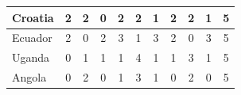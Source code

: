 \documentclass[12pt]{article}  %
\begin{document}
\begin{subappendices}
\begin{longtable}{|l|c|c|c|c|c|c|c|c|c|c|}
	\hline
	Croatia                                                        & 2                                                                      & 2                                                                      & 0                                                                      & 2                                                                      & 2                                                                      & 1                                                                      & 2                         & 2                           & 1                           & 5                           \\ 
	\hline
	Ecuador                                                        & 2                                                                      & 0                                                                      & 2                                                                      & 3                                                                      & 1                                                                      & 3                                                                      & 2                         & 0                           & 3                           & 5                           \\ 
	\hline
	Uganda                                                         & 0                                                                      & 1                                                                      & 1                                                                      & 1                                                                      & 4                                                                      & 1                                                                      & 1                         & 3                           & 1                           & 5                           \\ 
	\hline
	Angola                                                         & 0                                                                      & 2                                                                      & 0                                                                      & 1                                                                      & 3                                                                      & 1                                                                      & 0                         & 2                           & 0                           & 5                           \\ 

\end{longtable}
\end{subappendices}
\end{document}
